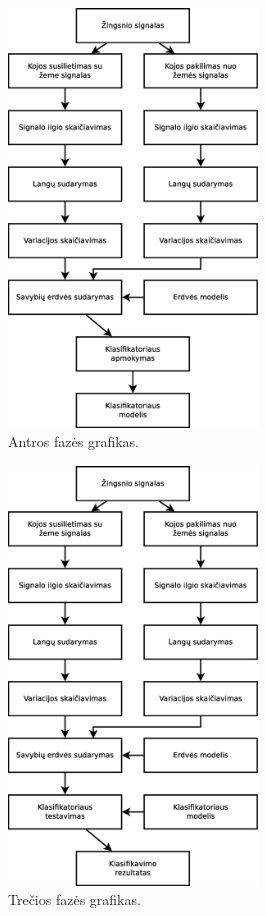 \documentclass[]{vgtuef}
\begin{document}
\begin{figure}[!t]
  \centering
  \includegraphics[width=250px]{figures/antra_faze.eps}
  \caption{Antros fazės grafikas.}
  \label{fig:antra_faze}
\end{figure}

\begin{figure}[!t]
  \centering
  \includegraphics[width=250px]{figures/trecia_faze.eps}
  \caption{Trečios fazės grafikas.}
  \label{fig:trecia_faze}
\end{figure}
\end{document}
